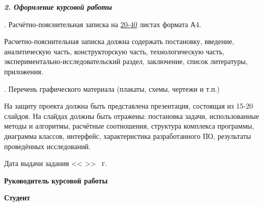 
\noindent \textbf{\textit{2. Оформление курсовой работы}}

. Расчётно-пояснительная записка на \uline{20-40} листах формата А4.



\noindent Расчетно-пояснительная записка должна содержать постановку, введение, аналитическую часть, конструкторскую часть, технологическую часть, экспериментально-исследовательский раздел, заключение, список литературы, приложения.%

. Перечень графического материала (плакаты, схемы, чертежи и т.п.)

\noindent На защиту проекта должна быть представлена презентация, состоящая из 15-20 слайдов. На слайдах должны быть отражены: постановка задачи, использованные методы и алгоритмы, расчётные соотношения, структура комплекса программы, диаграмма классов, интерфейс, характеристика разработанного ПО, результаты проведённых исследований.%



\noindent Дата выдачи задания << \uline{\hspace{0.5cm}} >> \uline{\hspace{2cm}} \the\year \ г.


\noindent \textbf{Руководитель курсовой работы} \hfill {} 


\thispagestyle{empty}

\noindent \textbf{Студент} \hfill {} 

\vfill
\fontsize{12pt}{12pt}\selectfont
